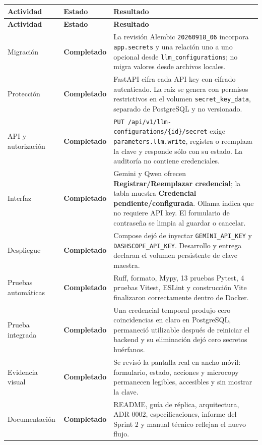 \documentclass[11pt,letterpaper]{article}
\newcommand{\statusok}{\textcolor{deepgreen}{\textbf{Completado}}}
\newcommand{\file}[1]{\texttt{#1}}
\begin{document}
\begin{longtable}{@{}p{}p{}p{}@{}}
  \toprule
  \textbf{Actividad} & \textbf{Estado} & \textbf{Resultado} \\
  \midrule
  \endfirsthead
  \toprule
  \textbf{Actividad} & \textbf{Estado} & \textbf{Resultado} \\
  \midrule
  \endhead
  Migración & \statusok & La revisión Alembic \file{20260918\_06} incorpora \file{app.secrets} y una relación uno a uno opcional desde \file{llm\_configurations}; no migra valores desde archivos locales. \\
  Protección & \statusok & FastAPI cifra cada API key con cifrado autenticado. La raíz se genera con permisos restrictivos en el volumen \file{secret\_key\_data}, separado de PostgreSQL y no versionado. \\
  API y autorización & \statusok & \file{PUT /api/v1/llm-configurations/\{id\}/secret} exige \file{parameters.llm.write}, registra o reemplaza la clave y responde sólo con su estado. La auditoría no contiene credenciales. \\
  Interfaz & \statusok & Gemini y Qwen ofrecen \textbf{Registrar/Reemplazar credencial}; la tabla muestra \textbf{Credencial pendiente/configurada}. Ollama indica que no requiere API key. El formulario de contraseña se limpia al guardar o cancelar. \\
  Despliegue & \statusok & Compose dejó de inyectar \file{GEMINI\_API\_KEY} y \file{DASHSCOPE\_API\_KEY}. Desarrollo y entrega declaran el volumen persistente de clave maestra. \\
  Pruebas automáticas & \statusok & Ruff, formato, Mypy, 13 pruebas Pytest, 4 pruebas Vitest, ESLint y construcción Vite finalizaron correctamente dentro de Docker. \\
  Prueba integrada & \statusok & Una credencial temporal produjo cero coincidencias en claro en PostgreSQL, permaneció utilizable después de reiniciar el backend y su eliminación dejó cero secretos huérfanos. \\
  Evidencia visual & \statusok & Se revisó la pantalla real en ancho móvil: formulario, estado, acciones y microcopy permanecen legibles, accesibles y sin mostrar la clave. \\
  Documentación & \statusok & README, guía de réplica, arquitectura, ADR 0002, especificaciones, informe del Sprint 2 y manual técnico reflejan el nuevo flujo. \\
  \bottomrule
\end{longtable}
\end{document}
